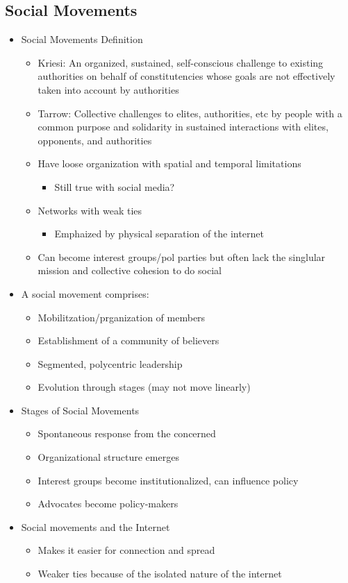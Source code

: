 \documentclass[11pt]{article}
\begin{document}
\subsection{Social Movements}
\label{sec:org67436ec}
\begin{itemize}
\item Social Movements Definition
\begin{itemize}
\item Kriesi: An organized, sustained, self-conscious challenge to existing authorities on behalf of constitutencies whose goals are not effectively taken into account by authorities
\item Tarrow: Collective challenges to elites, authorities, etc by people with a common purpose and solidarity in sustained interactions with elites, opponents, and authorities
\item Have loose organization with spatial and temporal limitations
\begin{itemize}
\item Still true with social media?
\end{itemize}
\item Networks with weak ties
\begin{itemize}
\item Emphaized by physical separation of the internet
\end{itemize}
\item Can become interest groups/pol parties but often lack the singlular mission and collective cohesion to do social
\end{itemize}
\item A social movement comprises:
\begin{itemize}
\item Mobilitzation/prganization of members
\item Establishment of a community of believers
\item Segmented, polycentric leadership
\item Evolution through stages (may not move linearly)
\end{itemize}
\item Stages of Social Movements
\begin{itemize}
\item Spontaneous response from the concerned
\item Organizational structure emerges
\item Interest groups become institutionalized, can influence policy
\item Advocates become policy-makers
\end{itemize}
\item Social movements and the Internet
\begin{itemize}
\item Makes it easier for connection and spread
\item Weaker ties because of the isolated nature of the internet
\end{itemize}
\end{itemize}
\end{document}
